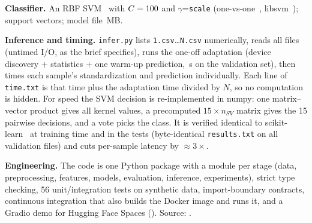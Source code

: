 \textbf{Classifier.} An RBF SVM~\cite{cortes1995} with $C=100$ and $\gamma$=\texttt{scale}
(one-vs-one~\cite{hsu2002}, libsvm~\cite{chang2011libsvm}); \NSV{} support vectors; model file
\ModelMB\,MB.

\textbf{Inference and timing.} \texttt{infer.py} lists \texttt{1.csv}\dots\texttt{N.csv}
numerically, reads all files (untimed I/O, as the brief specifies), runs the one-off
adaptation (device discovery + statistics + one warm-up prediction, \FinalAdaptS\,s on
the validation set), then times each sample's standardization and prediction individually.
Each line of \texttt{time.txt} is that time plus the adaptation time divided by $N$, so no
computation is hidden. For speed the SVM decision is re-implemented in numpy: one
matrix--vector product gives all kernel values, a precomputed $15\times n_{SV}$ matrix gives
the 15 pairwise decisions, and a vote picks the class. It is verified identical to
scikit-learn~\cite{pedregosa2011} at training time and in the tests (byte-identical
\texttt{results.txt} on all validation files) and cuts per-sample latency by $\approx 3\times$.

\textbf{Engineering.} The code is one Python package with a module per stage (data,
preprocessing, features, models, evaluation, inference, experiments), strict type checking, 56
unit/integration tests on synthetic data, import-boundary contracts, continuous integration
that also builds the Docker image and runs it, and a Gradio demo for Hugging Face Spaces
(\HFLink). Source: \RepoLink.
